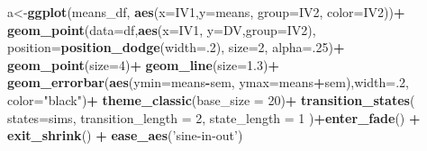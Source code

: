 \documentclass[]{book}
\newenvironment{Shaded}{\begin{snugshade}}{\end{snugshade}}
\newcommand{\DataTypeTok}[1]{\textcolor[rgb]{0.13,0.29,0.53}{#1}}
\newcommand{\DecValTok}[1]{\textcolor[rgb]{0.00,0.00,0.81}{#1}}
\newcommand{\FloatTok}[1]{\textcolor[rgb]{0.00,0.00,0.81}{#1}}
\newcommand{\KeywordTok}[1]{\textcolor[rgb]{0.13,0.29,0.53}{\textbf{#1}}}
\newcommand{\NormalTok}[1]{#1}
\newcommand{\OperatorTok}[1]{\textcolor[rgb]{0.81,0.36,0.00}{\textbf{#1}}}
\newcommand{\StringTok}[1]{\textcolor[rgb]{0.31,0.60,0.02}{#1}}
\begin{document}
\begin{Shaded}
\begin{Highlighting}[]
{{{{\NormalTok{a<-}\KeywordTok{ggplot}\NormalTok{(means_df, }\KeywordTok{aes}\NormalTok{(}\DataTypeTok{x=}\NormalTok{IV1,}\DataTypeTok{y=}\NormalTok{means, }
                                           \DataTypeTok{group=}\NormalTok{IV2,}
                                           \DataTypeTok{color=}\NormalTok{IV2))}\OperatorTok{+}
\StringTok{  }\KeywordTok{geom_point}\NormalTok{(}\DataTypeTok{data=}\NormalTok{df,}\KeywordTok{aes}\NormalTok{(}\DataTypeTok{x=}\NormalTok{IV1, }\DataTypeTok{y=}\NormalTok{DV,}\DataTypeTok{group=}\NormalTok{IV2), }
             \DataTypeTok{position=}\KeywordTok{position_dodge}\NormalTok{(}\DataTypeTok{width=}\NormalTok{.}\DecValTok{2}\NormalTok{),}
             \DataTypeTok{size=}\DecValTok{2}\NormalTok{,}
             \DataTypeTok{alpha=}\NormalTok{.}\DecValTok{25}\NormalTok{)}\OperatorTok{+}
\StringTok{  }\KeywordTok{geom_point}\NormalTok{(}\DataTypeTok{size=}\DecValTok{4}\NormalTok{)}\OperatorTok{+}
\StringTok{  }\KeywordTok{geom_line}\NormalTok{(}\DataTypeTok{size=}\FloatTok{1.3}\NormalTok{)}\OperatorTok{+}
\StringTok{  }\KeywordTok{geom_errorbar}\NormalTok{(}\KeywordTok{aes}\NormalTok{(}\DataTypeTok{ymin=}\NormalTok{means}\OperatorTok{-}\NormalTok{sem, }\DataTypeTok{ymax=}\NormalTok{means}\OperatorTok{+}\NormalTok{sem),}\DataTypeTok{width=}\NormalTok{.}\DecValTok{2}\NormalTok{,}
                \DataTypeTok{color=}\StringTok{"black"}\NormalTok{)}\OperatorTok{+}
\StringTok{  }\KeywordTok{theme_classic}\NormalTok{(}\DataTypeTok{base_size =} \DecValTok{20}\NormalTok{)}\OperatorTok{+}
\StringTok{  }\KeywordTok{transition_states}\NormalTok{(}
    \DataTypeTok{states=}\NormalTok{sims,}
    \DataTypeTok{transition_length =} \DecValTok{2}\NormalTok{,}
    \DataTypeTok{state_length =} \DecValTok{1}
\NormalTok{  )}\OperatorTok{+}\KeywordTok{enter_fade}\NormalTok{() }\OperatorTok{+}\StringTok{ }
\StringTok{  }\KeywordTok{exit_shrink}\NormalTok{() }\OperatorTok{+}
\StringTok{  }\KeywordTok{ease_aes}\NormalTok{(}\StringTok{'sine-in-out'}\NormalTok{)}

}}}}
\end{Highlighting}
\end{Shaded}
\end{document}
